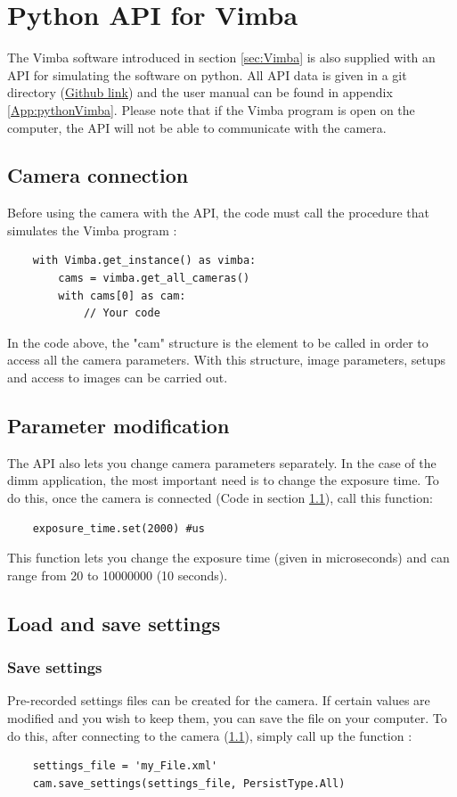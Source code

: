 \section{Python API for Vimba}
The Vimba software introduced in section \ref{sec:Vimba} is also supplied with an API for simulating the software on python.
All API data is given in a git directory (\href{https://github.com/alliedvision/VimbaPython}{Github link}) and the user manual
can be found in appendix \ref{App:pythonVimba}.\newline
Please note that if the Vimba program is open on the computer, the API will not be able to communicate with the camera.
\subsection{Camera connection}\label{sec:Soft_API_Connect}
Before using the camera with the API, the code must call the procedure that simulates the Vimba program :
\begin{verbatim}
    with Vimba.get_instance() as vimba:
        cams = vimba.get_all_cameras()
        with cams[0] as cam:
            // Your code
\end{verbatim}
In the code above, the "cam" structure is the element to be called in order to access all the camera parameters.
With this structure, image parameters, setups and access to images can be carried out.
\subsection{Parameter modification}
The API also lets you change camera parameters separately. In the case of the dimm application, the most important
need is to change the exposure time. To do this, once the camera is connected (Code in section \ref{sec:Soft_API_Connect}),
call this function:
\begin{verbatim}
    exposure_time.set(2000) #us
\end{verbatim}
This function lets you change the exposure time (given in microseconds) and can range from 20 to 10000000 (10 seconds).
\subsection{Load and save settings}
\subsubsection{Save settings}
Pre-recorded settings files can be created for the camera. If certain values are modified and you wish to keep them,
you can save the file on your computer. To do this, after connecting to the camera (\ref{sec:Soft_API_Connect}),
simply call up the function :
\begin{verbatim}
    settings_file = 'my_File.xml'
    cam.save_settings(settings_file, PersistType.All)
\end{verbatim}
